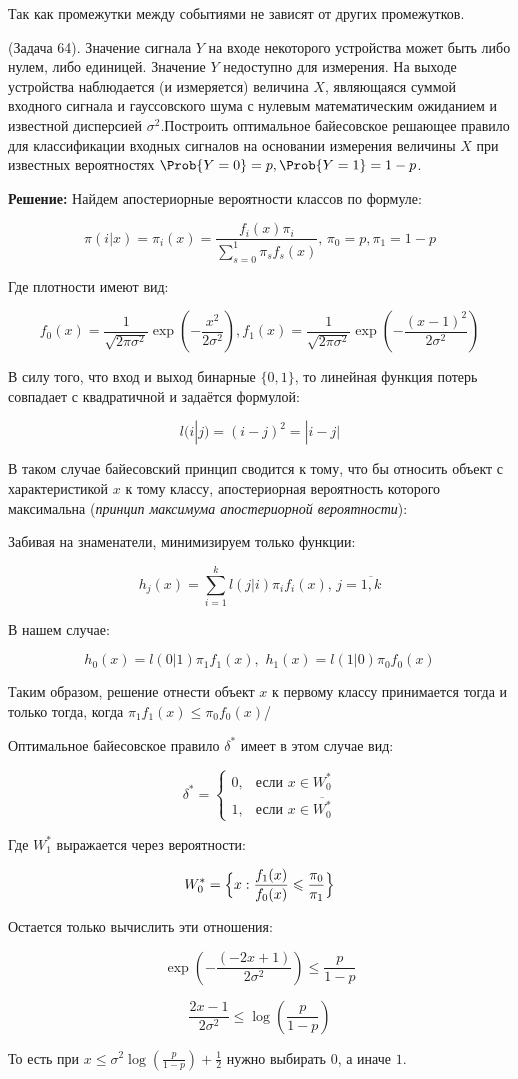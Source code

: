 \documentclass[12pt]{article}
\theoremstyle{definiton}
\theoremstyle{definition}
\theoremstyle{definition}
\let\leq\leqslant
\newcounter{problem}
\newcounter{subproblem}
\def\prp{\medskip\noindent\stepcounter{problem}{\bf Задача \theproblem .  }\setcounter{subproblem}{0} }
\begin{document}
Так как промежутки между событиями не зависят от других промежутков.

\prp (Задача 64). Значение сигнала $Y$ на входе некоторого устройства может быть либо нулем, либо единицей. Значение $Y$ недоступно для измерения. На выходе устройства наблюдается (и измеряется) величина $X$, являющаяся суммой входного сигнала и гауссовского шума с нулевым математическим ожиданием и известной дисперсией $\sigma^2$.Построить оптимальное байесовское решающее правило для классификации входных сигналов на основании измерения величины $X$ при известных вероятностях $\Prob\{Y = 0\} = p, \Prob\{Y = 1\} = 1 - p$.

\textbf{Решение: } Найдем апостериорные вероятности классов по формуле:

$$\pi(i|x) = \pi_i(x) = \frac{f_i(x) \pi_i}{\sum\limits_{s=0}^1\pi_s f_s(x)}, \, \pi_0 = p, \pi_1 = 1 - p$$

Где плотности имеют вид:

$$f_0(x) = \frac{1}{\sqrt{2\pi \sigma^2}}\exp{\left(-\frac{x^2}{2\sigma^2}\right)}, f_1(x) = \frac{1}{\sqrt{2\pi \sigma^2}}\exp{\left(-\frac{(x-1)^2}{2\sigma^2}\right)}$$

В силу того, что вход и выход бинарные $\{0,1\}$, то линейная функция потерь совпадает с квадратичной и задаётся формулой:

$$l(i|j) = (i-j)^2 = |i-j|$$

В таком случае байесовский принцип сводится к тому, что бы относить объект с характеристикой $x$ к тому классу, апостериорная вероятность которого максимальна (\textit{принцип максимума апостериорной вероятности}):

Забивая на знаменатели, минимизируем только функции:

$$h_j(x) = \sum\limits_{i=1}^k l(j|i) \pi_i f_i(x), \, j=\overline{1,k}$$

В нашем случае:

$$h_0(x) = l(0|1)\pi_1 f_1(x), \, \, h_1(x) = l(1|0) \pi_0 f_0(x)$$

Таким образом, решение отнести объект $x$ к первому классу принимается тогда и только тогда, когда $\pi_1 f_1(x) \leq \pi_0 f_0(x)$/

Оптимальное байесовское правило $\delta^*$ имеет в этом случае вид:

\[
	\delta^* =
	\begin{cases}
		0, & \text{если $x \in W_0^*$} \\
		1, & \text{если $x \in \overline{W_0^*}$}
	\end{cases}
\]

Где $W_1^*$ выражается через вероятности:

\[
W_0^* = \Bigl\{ x : \frac{f_1(x)}{f_0(x)} \leq \frac{\pi_0}{\pi_1}
\Bigr\}
\]

Остается только вычислить эти отношения:

$$\exp{\left(-\frac{(-2x + 1)}{2\sigma^2}\right)} \leq \frac{p}{1-p} $$

$$\frac{2x - 1}{2\sigma^2} \leq  \log {( \frac{p}{1-p} )} $$ 

То есть при $ x \leq \sigma^2 \log {( \frac{p}{1-p} )} + \frac12$ нужно выбирать $0$, а иначе $1$.
\end{document}
